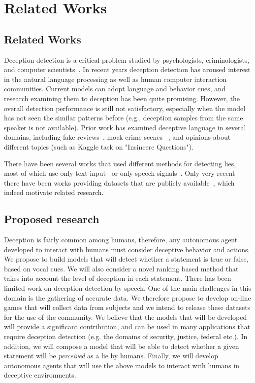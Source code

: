 \chapter{Related Works} %
\label{Chapter2}


\section {Related Works}

Deception detection is a critical problem studied by psychologists, criminologists, and computer scientists~\cite{depaulo2003cues}. In recent years deception detection has aroused interest in the natural language processing as well as human computer interaction communities. Current models can adopt language and behavior cues, and research examining them to deception has been quite promising. However, the overall detection performance is still not satisfactory, especially when the model has not seen the similar patterns before (e.g., deception samples from the same speaker is not available). Prior work has examined deceptive language in several domains, including fake reviews~\cite{levitan2018linguistic}, mock crime scenes~\cite{bachenko2008verification,de2018mafiascum}
, and opinions about different topics (such as Kaggle task on "Insincere Questions").

There have been several works that used different methods for detecting lies, most of which use only text input~\cite{de2018mafiascum,fitzpatrick2015automatic} or only speech signals~\cite{enos2009detecting}. Only very recent there have been works providing datasets that are publicly available~\cite{perez2015experiments,de2018mafiascum}, which indeed motivate related research.



\section {Proposed research}

Deception is fairly common among humans, therefore, any autonomous agent developed to interact with humans must consider deceptive behavior and actions. We propose to build models that will detect whether a statement is true or false, based on vocal cues. We will also consider a novel ranking based method that takes into account the level of deception in each statement.
There has been limited work on deception detection by speech. One of the main challenges in this domain is the gathering of accurate data. We therefore propose to develop on-line games that will collect data from subjects and we intend to release these datasets for the use of the community. 
We believe that the models that will be developed will provide a significant contribution, and can be used in many applications that require deception detection (e.g. the domains of security, justice, federal etc.).
In addition, we will compose a model that will be able to detect whether a given statement will be \emph{perceived} as a lie by humans. Finally, we will develop autonomous agents that will use the above models to interact with humans in deceptive environments.


